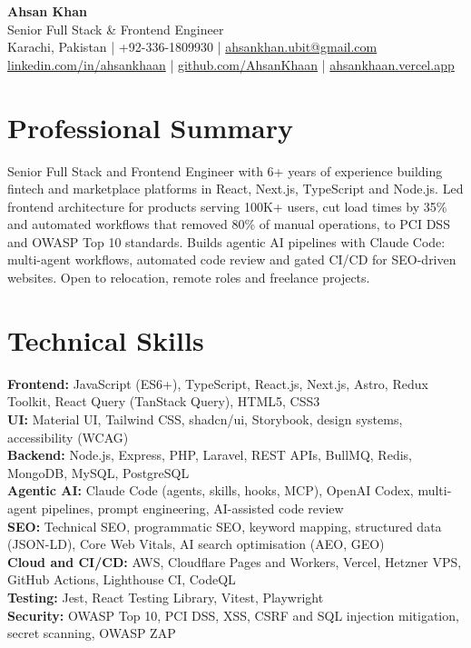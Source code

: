 \documentclass[10.5pt,a4paper]{article}
\begin{document}
\begin{center}
  {\LARGE\bfseries Ahsan Khan}\\[3pt]
  Senior Full Stack \& Frontend Engineer\\[3pt]
  Karachi, Pakistan | +92-336-1809930 | \href{mailto:ahsankhan.ubit@gmail.com}{ahsankhan.ubit@gmail.com}\\
  \href{https://linkedin.com/in/ahsankhaan}{linkedin.com/in/ahsankhaan} |
  \href{https://github.com/AhsanKhaan}{github.com/AhsanKhaan} |
  \href{https://ahsankhaan.vercel.app}{ahsankhaan.vercel.app}
\end{center}

\section{Professional Summary}
Senior Full Stack and Frontend Engineer with 6+ years of experience building fintech and marketplace
platforms in React, Next.js, TypeScript and Node.js. Led frontend architecture for products serving 100K+
users, cut load times by 35\% and automated workflows that removed 80\% of manual operations, to PCI DSS and
OWASP Top 10 standards. Builds agentic AI pipelines with Claude Code: multi-agent workflows, automated code
review and gated CI/CD for SEO-driven websites. Open to relocation, remote roles and freelance projects.

\section{Technical Skills}
\textbf{Frontend:} JavaScript (ES6+), TypeScript, React.js, Next.js, Astro, Redux Toolkit, React Query (TanStack Query), HTML5, CSS3\\
\textbf{UI:} Material UI, Tailwind CSS, shadcn/ui, Storybook, design systems, accessibility (WCAG)\\
\textbf{Backend:} Node.js, Express, PHP, Laravel, REST APIs, BullMQ, Redis, MongoDB, MySQL, PostgreSQL\\
\textbf{Agentic AI:} Claude Code (agents, skills, hooks, MCP), OpenAI Codex, multi-agent pipelines, prompt engineering, AI-assisted code review\\
\textbf{SEO:} Technical SEO, programmatic SEO, keyword mapping, structured data (JSON-LD), Core Web Vitals, AI search optimisation (AEO, GEO)\\
\textbf{Cloud and CI/CD:} AWS, Cloudflare Pages and Workers, Vercel, Hetzner VPS, GitHub Actions, Lighthouse CI, CodeQL\\
\textbf{Testing:} Jest, React Testing Library, Vitest, Playwright\\
\textbf{Security:} OWASP Top 10, PCI DSS, XSS, CSRF and SQL injection mitigation, secret scanning, OWASP ZAP
\end{document}
